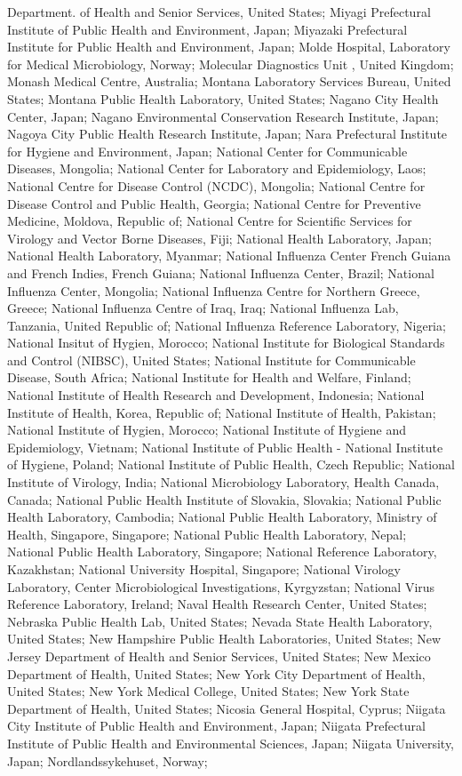 \documentclass[9pt,lineno]{elife} %
\begin{document}
\begin{appendixbox}
Department. of Health and Senior Services, United States; Miyagi Prefectural Institute of Public Health and Environment, Japan; Miyazaki Prefectural Institute for Public Health and Environment, Japan; Molde Hospital, Laboratory for Medical Microbiology, Norway; Molecular Diagnostics Unit , United Kingdom; Monash Medical Centre, Australia; Montana Laboratory Services Bureau, United States; Montana Public Health Laboratory, United States; Nagano City Health Center, Japan; Nagano Environmental Conservation Research Institute, Japan; Nagoya City Public Health Research Institute, Japan; Nara Prefectural Institute for Hygiene and Environment, Japan; National Center for Communicable Diseases, Mongolia; National Center for Laboratory and Epidemiology, Laos; National Centre for Disease Control (NCDC), Mongolia; National Centre for Disease Control and Public Health, Georgia; National Centre for Preventive Medicine, Moldova, Republic of; National Centre for Scientific Services for Virology and Vector Borne Diseases, Fiji; National Health Laboratory, Japan; National Health Laboratory, Myanmar; National Influenza Center French Guiana and French Indies, French Guiana; National Influenza Center, Brazil; National Influenza Center, Mongolia; National Influenza Centre for Northern Greece, Greece; National Influenza Centre of Iraq, Iraq; National Influenza Lab, Tanzania, United Republic of; National Influenza Reference Laboratory, Nigeria; National Insitut of Hygien, Morocco; National Institute for Biological Standards and Control (NIBSC), United States; National Institute for Communicable Disease, South Africa; National Institute for Health and Welfare, Finland; National Institute of Health Research and Development, Indonesia; National Institute of Health, Korea, Republic of; National Institute of Health, Pakistan; National Institute of Hygien, Morocco; National Institute of Hygiene and Epidemiology, Vietnam; National Institute of Public Health - National Institute of Hygiene, Poland; National Institute of Public Health, Czech Republic; National Institute of Virology, India; National Microbiology Laboratory, Health Canada, Canada; National Public Health Institute of Slovakia, Slovakia; National Public Health Laboratory, Cambodia; National Public Health Laboratory, Ministry of Health, Singapore, Singapore; National Public Health Laboratory, Nepal; National Public Health Laboratory, Singapore; National Reference Laboratory, Kazakhstan; National University Hospital, Singapore; National Virology Laboratory, Center Microbiological Investigations, Kyrgyzstan; National Virus Reference Laboratory, Ireland; Naval Health Research Center, United States; Nebraska Public Health Lab, United States; Nevada State Health Laboratory, United States; New Hampshire Public Health Laboratories, United States; New Jersey Department of Health and Senior Services, United States; New Mexico Department of Health, United States; New York City Department of Health, United States; New York Medical College, United States; New York State Department of Health, United States; Nicosia General Hospital, Cyprus; Niigata City Institute of Public Health and Environment, Japan; Niigata Prefectural Institute of Public Health and Environmental Sciences, Japan; Niigata University, Japan; Nordlandssykehuset, Norway; 
\end{appendixbox}
\end{document}
